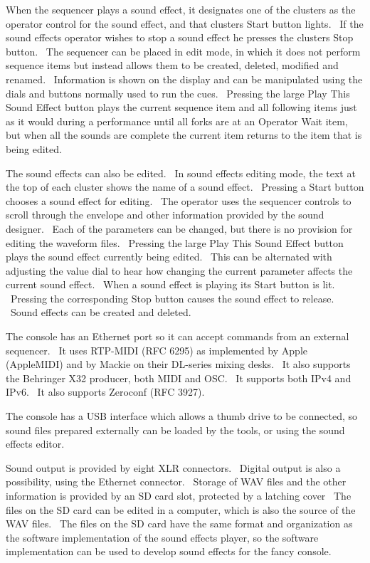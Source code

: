 \documentclass[letterpaper]{article}
\begin{document}
When the sequencer plays a sound effect, it designates one of the
clusters as the operator control for the sound effect, and that
cluster{\textquotesingle}s Start button lights. \ If the sound effects
operator wishes to stop a sound effect he presses the
cluster{\textquotesingle}s Stop button. \ The sequencer can be placed
in edit mode, in which it does not perform sequence items but instead
allows them to be created, deleted, modified and renamed. \ Information
is shown on the display and can be manipulated using the dials and
buttons normally used to run the cues. \ Pressing the large Play This
Sound Effect button plays the current sequence item and all following
items just as it would during a performance until all forks are at an
Operator Wait item, but when all the sounds are complete the current
item returns to the item that is being edited.

The sound effects can also be edited. \ In sound effects editing mode,
the text at the top of each cluster shows the name of a sound effect.
\ Pressing a Start button chooses a sound effect for editing. \ The
operator uses the sequencer controls to scroll through the envelope and
other information provided by the sound designer. \ Each of the
parameters can be changed, but there is no provision for editing the
waveform files. \ Pressing the large Play This Sound Effect button
plays the sound effect currently being edited. \ This can be alternated
with adjusting the value dial to hear how changing the current
parameter affects the current sound effect. \ When a sound effect is
playing its Start button is lit. \ Pressing the corresponding Stop
button causes the sound effect to release. \ Sound effects can be
created and deleted.

The console has an Ethernet port so it can accept commands from an
external sequencer. \ It uses RTP-MIDI (RFC 6295) as implemented by
Apple (AppleMIDI) and by Mackie on their DL-series mixing desks. \ It
also supports the Behringer X32 producer, both MIDI and OSC. \ It
supports both IPv4 and IPv6. \ It also supports Zeroconf (RFC 3927).

The console has a USB interface which allows a thumb drive to be
connected, so sound files prepared externally can be loaded by the
tools, or using the sound effects editor.

Sound output is provided by eight XLR connectors. \ Digital output is
also a possibility, using the Ethernet connector. \ Storage of WAV
files and the other information is provided by an SD card slot,
protected by a latching cover \ The files on the SD card can be edited
in a computer, which is also the source of the WAV files. \ The files
on the SD card have the same format and organization as the software
implementation of the sound effects player, so the software
implementation can be used to develop sound effects for the fancy
console.
\end{document}
